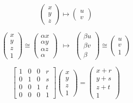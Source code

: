 \documentclass[10pt, a4paper, fleqn]{scrartcl}
\begin{document}
\begin{equation*}
\begin{pmatrix}
x \\
y \\
z
\end{pmatrix}
\mapsto
\begin{pmatrix}
u \\
v
\end{pmatrix}
\end{equation*}


\begin{equation*}
\begin{pmatrix}
x \\
y \\
z \\
1
\end{pmatrix}
\cong
\begin{pmatrix}
\alpha x \\
\alpha y \\
\alpha z \\
\alpha
\end{pmatrix}
~~
\mapsto
~~
\begin{pmatrix}
\beta u \\
\beta v \\
\beta
\end{pmatrix}
\cong
\begin{pmatrix}
u \\
v \\
1
\end{pmatrix}
\end{equation*}

\begin{equation*}
\begin{bmatrix}
1 & 0 & 0 & r \\
0 & 1 & 0 & s \\
0 & 0 & 1 & t \\
0 & 0 & 0 & 1
\end{bmatrix}
\begin{pmatrix}
x \\
y \\
z \\
1
\end{pmatrix}
=
\begin{pmatrix}
x+r \\
y+s \\
z+t \\
1
\end{pmatrix}
\end{equation*}
\end{document}
